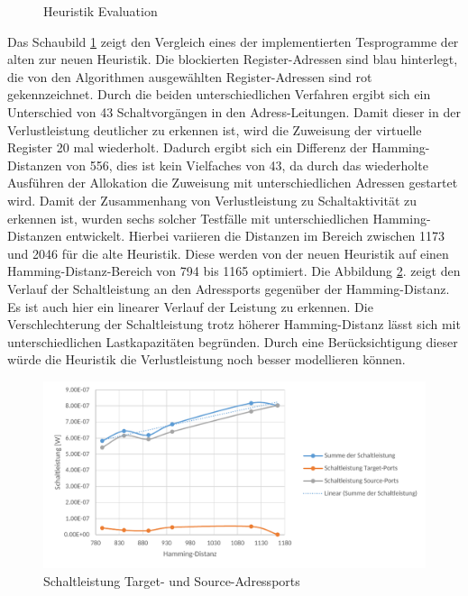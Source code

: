 \begin{figure}[H] 
	\centering
	
	\caption{Heuristik Evaluation}
	\label{fig:heuristik_eval}
\end{figure}
Das Schaubild \ref{fig:heuristik_eval} zeigt den Vergleich eines der implementierten Tesprogramme der alten zur neuen Heuristik. Die blockierten Register-Adressen sind blau hinterlegt, die von den Algorithmen ausgewählten Register-Adressen sind rot gekennzeichnet. Durch die beiden unterschiedlichen Verfahren ergibt sich ein Unterschied von 43 Schaltvorgängen in den Adress-Leitungen. Damit dieser in der Verlustleistung deutlicher zu erkennen ist, wird die Zuweisung der virtuelle Register 20 mal wiederholt. Dadurch ergibt sich ein Differenz der Hamming-Distanzen von 556, dies ist kein Vielfaches von 43, da durch das wiederholte Ausführen der Allokation die Zuweisung mit unterschiedlichen Adressen gestartet wird.
Damit der Zusammenhang von Verlustleistung zu Schaltaktivität zu erkennen ist, wurden sechs solcher Testfälle mit unterschiedlichen Hamming-Distanzen entwickelt. Hierbei variieren die Distanzen im Bereich zwischen 1173 und 2046 für die alte Heuristik. Diese werden von der neuen Heuristik auf einen Hamming-Distanz-Bereich von 794 bis 1165 optimiert.
Die Abbildung \ref{fig:schaltleistung_heuristic}. zeigt den Verlauf der Schaltleistung an den Adressports gegenüber der Hamming-Distanz. Es ist auch hier ein linearer Verlauf der Leistung zu erkennen. Die Verschlechterung der Schaltleistung trotz höherer Hamming-Distanz lässt sich mit unterschiedlichen Lastkapazitäten begründen. Durch eine Berücksichtigung dieser würde die Heuristik die Verlustleistung noch besser modellieren können. 
\begin{figure}[H]
	\centering
	\includegraphics[width=\textwidth]{fig/schaltleistung_heuristic.pdf}
	\caption{Schaltleistung Target- und Source-Adressports}
	\label{fig:schaltleistung_heuristic}
\end{figure}

